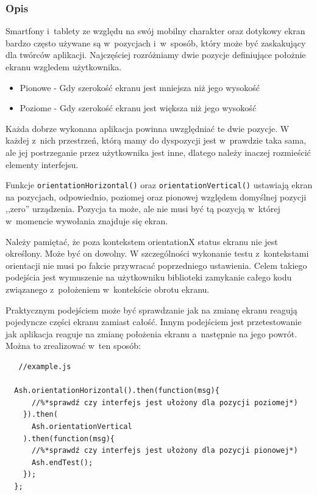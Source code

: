 \documentclass[brudnopis]{xmgr}
\begin{document}
\subsubsection{Opis}

Smartfony i~tablety ze względu na swój mobilny charakter oraz dotykowy ekran bardzo często używane są w~pozycjach i~w~sposób, który może być zaskakujący dla twórców aplikacji. Najczęściej rozróżniamy dwie pozycje definiujące położnie ekranu wzgledem użytkownika. 

\begin{itemize}
  \item Pionowe - Gdy szerokość ekranu jest mniejsza niż jego wysokość
  \item Poziome - Gdy szerokość ekranu jest większa niż jego wysokość
\end{itemize}

Każda dobrze wykonana aplikacja powinna uwzględniać te dwie pozycje. W każdej z~nich przestrzeń, którą mamy do dyspozycji jest w~prawdzie taka sama, ale jej postrzeganie przez użytkownika jest inne, dlatego należy inaczej rozmieścić elementy interfejsu.  

Funkcje \texttt{orientationHorizontal()} oraz \texttt{orientationVertical()} ustawiają ekran na pozycjach, odpowiednio, poziomej oraz pionowej względem domyślnej pozycji ,,zero'' urządzenia. Pozycja ta może, ale nie musi być tą pozycją w~której w~momencie wywołania znajduje się ekran.  

Należy pamiętać, że poza kontekstem orientationX status ekranu nie jest określony. Może być on dowolny. W szczególności wykonanie testu z~kontekstami orientacji nie musi po fakcie przywracać poprzedniego ustawienia. Celem takiego podejścia jest wymuszenie na użytkowniku biblioteki zamykanie całego kodu związanego z~położeniem w~kontekście obrotu ekranu. 

Praktycznym podejściem może być sprawdzanie jak na zmianę ekranu reagują pojedyncze części ekranu zamiast całość. Innym podejściem jest przetestowanie jak aplikacja reaguje na zmianę położenia ekranu a~następnie na jego powrót. Można to zrealizować w~ten sposób:

\begin{lstlisting}
   //example.js

  Ash.orientationHorizontal().then(function(msg){
      //%*sprawdź czy interfejs jest ułożony dla pozycji poziomej*)
    }).then(
      Ash.orientationVertical
    ).then(function(msg){
      //%*sprawdź czy interfejs jest ułożony dla pozycji pionowej*)
      Ash.endTest();
    });
  };
\end{lstlisting}
\end{document}
